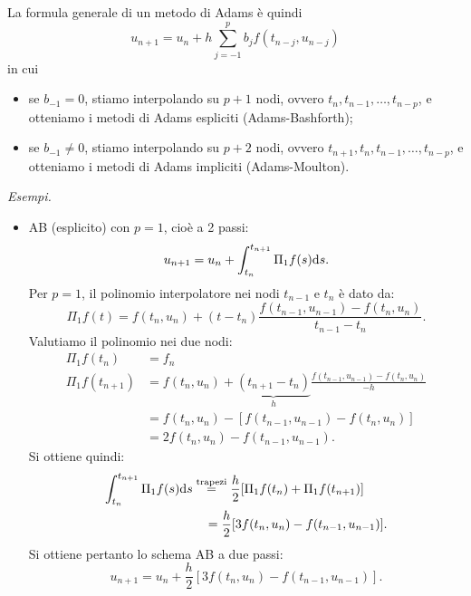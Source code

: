 La formula generale di un metodo di Adams è quindi
\begin{equation}
u_{n+1} =u_{n} +h\sum\limits ^{p}_{j=-1} b_{j} f( t_{n-j} ,u_{n-j})
\end{equation}
in cui
\begin{itemize}
\item se $b_{-1} =0$, stiamo interpolando su $p+1$ nodi, ovvero $t_{n} ,t_{n-1} ,\dotsc ,t_{n-p}$, e otteniamo i metodi di Adams espliciti (Adams-Bashforth);
\item se $b_{-1} \neq 0$, stiamo interpolando su $p+2$ nodi, ovvero $t_{n+1} ,t_{n} ,t_{n-1} ,\dotsc ,t_{n-p}$, e otteniamo i metodi di Adams impliciti (Adams-Moulton).
\end{itemize}

\textit{Esempi.}
\begin{itemize}
\item AB (esplicito) con $p=1$, cioè a 2 passi:
\begin{equation*}
u_{n+1} =u_{n} +\int\nolimits ^{t_{n+1}}_{t_{n}} \Pi _{1} f(s) \mathrm d s.
\end{equation*}
Per $p=1$, il polinomio interpolatore nei nodi $t_{n-1}$ e $t_{n}$ è dato da:
\begin{equation*}
\Pi _{1} f(t) =f( t_{n} ,u_{n}) +( t-t_{n})\frac{f( t_{n-1} ,u_{n-1}) -f( t_{n} ,u_{n})}{t_{n-1} -t_{n}}.
\end{equation*}
Valutiamo il polinomio nei due nodi:
\begin{equation*}
\begin{aligned}
\Pi _{1} f( t_{n}) & =f_{n}\\
\Pi _{1} f( t_{n+1}) & =f( t_{n} ,u_{n}) +\underbrace{( t_{n+1} -t_{n})}_{h}\frac{f( t_{n-1} ,u_{n-1}) -f( t_{n} ,u_{n})}{-h}\\
 & =f( t_{n} ,u_{n}) -[ f( t_{n-1} ,u_{n-1}) -f( t_{n} ,u_{n})]\\
 & =2f( t_{n} ,u_{n}) -f( t_{n-1} ,u_{n-1}).
\end{aligned}
\end{equation*}
Si ottiene quindi:
\begin{align*}
\int\nolimits ^{t_{n+1}}_{t_{n}} \Pi _{1} f(s) \mathrm d s &\overset{\text{trapezi}}{=}\frac{h}{2}[ \Pi _{1} f( t_{n}) +\Pi _{1} f( t_{n+1})] \\
& \ \ \;  = \frac{h}{2}[ 3f( t_{n} ,u_{n}) -f( t_{n-1} ,u_{n-1})].
\end{align*}
Si ottiene pertanto lo schema AB a due passi:
\begin{equation*}
u_{n+1} =u_{n} +\frac{h}{2}[ 3f( t_{n} ,u_{n}) -f( t_{n-1} ,u_{n-1})].

\end{equation*}
\end{itemize}
